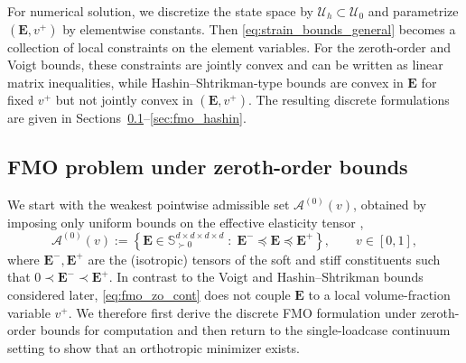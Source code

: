\documentclass[preprint,3p]{elsarticle}
\newcommand{\tensf}[1]{\bm{\mathbf{#1}}}            %
\newcommand{\Emin}{\tensf{E}^{-}}                   %
\newcommand{\Emax}{\tensf{E}^{+}}                   %
\begin{document}
For numerical solution, we discretize the state space by $\mathcal{U}_h\subset\mathcal{U}_0$ and parametrize $(\tensf{E},v^+)$ by elementwise constants. Then \eqref{eq:strain_bounds_general} becomes a collection of local constraints on the element variables. For the zeroth-order and Voigt bounds, these constraints are jointly convex and can be written as linear matrix inequalities, while Hashin--Shtrikman-type bounds are convex in $\tensf{E}$ for fixed $v^+$ but not jointly convex in $(\tensf{E},v^+)$. The resulting discrete formulations are given in Sections~\ref{sec:fmo_zero}--\ref{sec:fmo_hashin}.

\subsection{FMO problem under zeroth-order bounds}\label{sec:fmo_zero}

We start with the weakest pointwise admissible set $\mathcal{A}^{(0)}(v)$, obtained by imposing only uniform bounds on the effective elasticity tensor \citep{Lobos2016,Ringertz1993},
%
\begin{equation}\label{eq:fmo_zo_cont}
    \mathcal{A}^{(0)}(v):=
    \left\{\tensf E\in \mathbb{S}^{d\times d\times d\times d}_{\succ 0}\;:\;
    \Emin \preceq \tensf E \preceq \Emax
    \right\},\qquad v\in[0,1],
\end{equation}
%
where $\Emin,\Emax$ are the (isotropic) tensors of the soft and stiff constituents such that $0 \prec \Emin \prec \Emax$. In contrast to the Voigt and Hashin--Shtrikman bounds considered later, \eqref{eq:fmo_zo_cont} does not couple $\tensf E$ to a local volume-fraction variable $v^+$. We therefore first derive the discrete FMO formulation under zeroth-order bounds for computation and then return to the single-loadcase continuum setting to show that an orthotropic minimizer exists.
\end{document}

